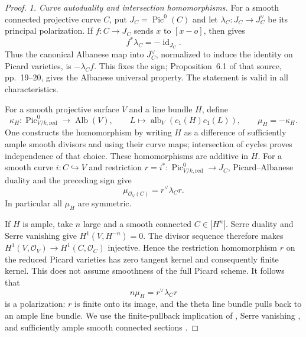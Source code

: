 \begin{proof}
\emph{1. Curve autoduality and intersection homomorphisms.}
For a smooth connected projective curve $C$, put
$J_C=\operatorname{Pic}^0(C)$ and let
$\lambda_C:J_C\to J_C^\vee$ be its principal polarization.
If $f:C\to J_C$ sends $x$ to $[x-o]$, then
\citet[Lemma 6.9 and Remark 6.10(c), author p.~23]
{D_MilneJacobians2021} gives
\[
                         f^*\lambda_C=-\operatorname{id}_{J_C}.
\]
Thus the canonical Albanese map into $J_C^\vee$, normalized
to induce the identity on Picard varieties, is $-\lambda_C f$.
This fixes the sign; Proposition~6.1 of that source,
pp.~19--20, gives the Albanese universal property. The statement
is valid in all characteristics.

For a smooth projective surface $V$ and a line bundle $H$, define
\[
 \kappa_H:\operatorname{Pic}^0_{V/k,\mathrm{red}}\to
              \operatorname{Alb}(V),\qquad
 L\longmapsto\operatorname{alb}_V(c_1(H)c_1(L)),\qquad
 \mu_H=-\kappa_H.
\]
One constructs the homomorphism by writing $H$ as a difference
of sufficiently ample smooth divisors and using their curve maps;
intersection of cycles proves independence of that choice.
These homomorphisms are additive in $H$.
For a smooth curve $i:C\hookrightarrow V$ and restriction
$r=i^*:\operatorname{Pic}^0_{V/k,\mathrm{red}}\to J_C$,
Picard--Albanese duality and the preceding sign give
\begin{equation}
                  \mu_{\mathcal O_V(C)}=r^\vee\lambda_Cr.
                                                        \tag{AM.5}
\end{equation}
In particular all $\mu_H$ are symmetric.

If $H$ is ample, take $n$ large and a smooth connected
$C\in|H^n|$. Serre duality and Serre vanishing give
$H^1(V,H^{-n})=0$. The divisor sequence therefore makes
$H^1(V,\mathcal O_V)\to H^1(C,\mathcal O_C)$ injective.
Hence the restriction homomorphism $r$ on the reduced Picard
varieties has zero tangent kernel and consequently finite kernel.
This does not assume smoothness of the full Picard scheme.
It follows that
\begin{equation}
                           n\mu_H=r^\vee\lambda_Cr       \tag{AM.6}
\end{equation}
is a polarization: $r$ is finite onto its image, and the theta
line bundle pulls back to an ample line bundle. We use the
finite-pullback implication of
\citet[Lemma 30.17.2 and its proof]{frC3beStacksFiniteAmple},
Serre vanishing
\citep[Lemma 30.17.1]{frC3azStacksSerre}, and sufficiently
ample smooth connected sections
\citep[Lemma 45.8.3]{frC3azStacksBertini}.


\end{proof}
